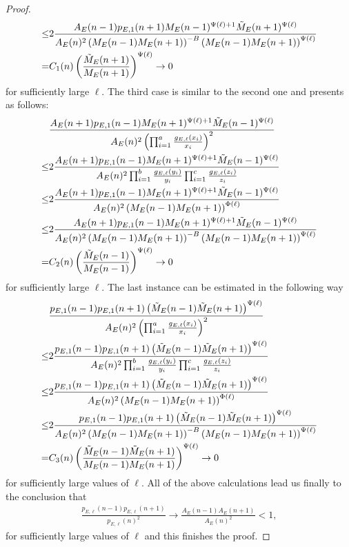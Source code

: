 \documentclass[10pt,a4paper]{amsart}
\begin{document}
\begin{proof}
\begin{align*}
\leq
&2\frac{A_E(n-1)p_{E,1}(n+1)M_E(n-1)^{\Psi(\ell)+1}\Tilde{M}_E(n+1)^{\Psi(\ell)}}{A_E(n)^2\left(M_E(n-1)M_E(n+1)\right)^{-
B}\left(M_E(n-1)M_E(n+1)\right)^{\Psi(\ell)}}\\
=&C_1(n)\left(\frac{\Tilde{M}_E(n+1)}{M_E(n+1)}\right)^{\Psi(\ell)}\rightarrow 0
\end{align*}
for sufficiently large $\ell $.
The third case is similar to the second one and presents as follows:
\begin{align*}
&\frac{A_E(n+1)p_{E,1}(n-1)M_E(n+1)^{\Psi(\ell)+1}\Tilde{M}_E(n-1)^{\Psi(\ell)}}{A_E(n)^2\left(\prod_{i=1}^a\frac{g_{E,\ell }(x_i)}{x_i}\right)^2}\\
\leq
&2\frac{A_E(n+1)p_{E,1}(n-1)M_E(n+1)^{\Psi(\ell)+1}\Tilde{M}_E(n-1)^{\Psi(\ell)}}{A_E(n)^2\prod_{i=1}^b\frac{g_{E,\ell }(y_i)}{y_i}\prod_{i=1}^c\frac{g_{E,\ell }(z_i)}{z_i}}\\
\leq& 2\frac{A_E(n+1)p_{E,1}(n-1)M_E(n+1)^{\Psi(\ell)+1}\Tilde{M}_E(n-1)^{\Psi(\ell)}}{A_E(n)^2\left(M_E(n-1)M_E(n+1)\right)^{\Phi(\ell)}}\\
\leq
&2\frac{A_E(n+1)p_{E,1}(n-1)M_E(n+1)^{\Psi(\ell)+1}\Tilde{M}_E(n-1)^{\Psi(\ell)}}{A_E(n)^2\left(M_E(n-1)M_E(n+1)\right)^{-
B}\left(M_E(n-1)M_E(n+1)\right)^{\Psi(\ell)}}\\
=&C_2(n)\left(\frac{\Tilde{M}_E(n-1)}{M_E(n-1)}\right)^{\Psi(\ell)}\rightarrow 0
\end{align*}
for sufficiently large $\ell $.
The last instance can be estimated in the following way
\begin{align*}
&\frac{p_{E,1}(n-1)p_{E,1}(n+1)\left(\Tilde{M}_E(n-1)\Tilde{M}_E(n+1)\right)^{\Psi(\ell)}}{A_E(n)^2\left(\prod_{i=1}^a\frac{g_{E,\ell }(x_i)}{x_i}\right)^2}\\
\leq
&2\frac{p_{E,1}(n-1)p_{E,1}(n+1)\left(\Tilde{M}_E(n-1)\Tilde{M}_E(n+1)\right)^{\Psi(\ell)}}{A_E(n)^2\prod_{i=1}^b\frac{g_{E,\ell }(y_i)}{y_i}\prod_{i=1}^c\frac{g_{E,\ell }(z_i)}{z_i}}\\
\leq& 2\frac{p_{E,1}(n-1)p_{E,1}(n+1)\left(\Tilde{M}_E(n-1)\Tilde{M}_E(n+1)\right)^{\Psi(\ell)}}{A_E(n)^2\left(M_E(n-1)M_E(n+1)\right)^{\Phi(\ell)}}\\
\leq
&2\frac{p_{E,1}(n-1)p_{E,1}(n+1)\left(\Tilde{M}_E(n-1)\Tilde{M}_E(n+1)\right)^{\Psi(\ell)}}{A_E(n)^2\left(M_E(n-1)M_E(n+1)\right)^{-
B}\left(M_E(n-1)M_E(n+1)\right)^{\Psi(\ell)}}\\
=&C_3(n)\left(\frac{\Tilde{M}_E(n-1)\Tilde{M}_E(n+1)}{M_E(n-1)M_E(n+1)}\right)^{\Psi(\ell)}\rightarrow 0
\end{align*}
for sufficiently large values of
$\ell $.
All of the above calculations lead us finally to the conclusion that
\begin{align*}
\frac{p_{E,\ell }(n-1)p_{E,\ell }(n+1)}{p_{E,\ell }(n)^2}\rightarrow \frac{A_E(n-1)A_E(n+1)}{A_E(n)^2}<1,
\end{align*}
for sufficiently large values of
$\ell $
and this finishes the proof.
\end{proof}
\end{document}
